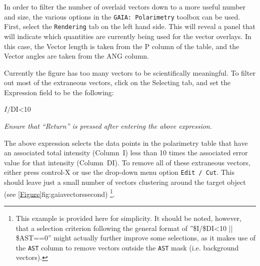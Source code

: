 In order to filter the number of overlaid vectors down to a more
useful number and size, the various options in the
\texttt{GAIA: Polarimetry} toolbox can be used. First, select the
\texttt{Rendering} tab on the
left hand side. This will reveal a panel that will indicate which
quantities are currently being used for the vector overlays. In this
case, the Vector length is taken from the P column of the table, and
the Vector angles are taken from the ANG column.

Currently the figure has too many vectors to be scientifically
meaningful. To filter out most of the extraneous vectors, click on the
Selecting tab, and set the Expression field to be the following:

\begin{terminalv}
$I/$DI<10
\end{terminalv}

\emph{Ensure that ``Return'' is pressed after entering the above expression}.

The above expression selects the data points in the polarimetry table
that have an associated total intensity (Column~I) less than 10 times
the associated error value for that intensity (Column~DI). To remove
all of these extraneous vectors, either press control-X or use the
drop-down menu option \texttt{Edit / Cut}.  This should leave just a
small number of vectors clustering around the target object (see
\cref{Figure}{fig:gaiavectorssecond}{})
\footnote{This example is provided here for simplicity. It should be noted, however, that a selection criterion following the general format of ''\$I/\$DI<10 || \$AST==0'' might actually further improve some selections, as it makes use of the \texttt{AST} column to remove vectors outside the \texttt{AST} mask (i.e. background vectors).}.

